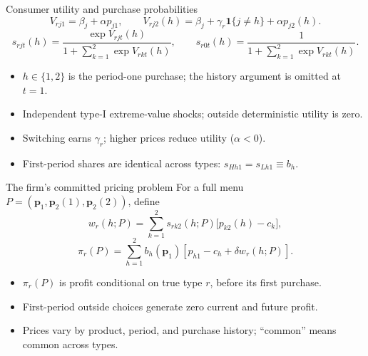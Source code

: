\documentclass[aspectratio=169,11pt]{beamer}
\begin{document}
\begin{frame}[noframenumbering]{Consumer utility and purchase probabilities}
\[
V_{rj1}=\beta_j+\alpha p_{j1},\qquad
V_{rj2}(h)=\beta_j+\gamma_r\mathbf1\{j\ne h\}+\alpha p_{j2}(h).
\]
\[
s_{rjt}(h)=\frac{\exp V_{rjt}(h)}{1+\sum_{k=1}^2\exp V_{rkt}(h)},\qquad
s_{r0t}(h)=\frac{1}{1+\sum_{k=1}^2\exp V_{rkt}(h)}.
\]
\begin{itemize}
\item $h\in\{1,2\}$ is the period-one purchase; the history argument is omitted at $t=1$.
\item Independent type-I extreme-value shocks; outside deterministic utility is zero.
\item Switching earns $\gamma_r$; higher prices reduce utility ($\alpha<0$).
\item First-period shares are identical across types: $s_{Hh1}=s_{Lh1}\equiv b_h$.
\end{itemize}
\par\hyperlink{pricing-setup}{}
\end{frame}

\begin{frame}[noframenumbering]{The firm's committed pricing problem}
For a full menu $P=(\mathbf p_1,\mathbf p_2(1),\mathbf p_2(2))$, define
\[
w_r(h;P)=\sum_{k=1}^2s_{rk2}(h;P)\bigl[p_{k2}(h)-c_k\bigr],
\]
\[
\pi_r(P)=\sum_{h=1}^2 b_h(\mathbf p_1)
\left[p_{h1}-c_h+\delta w_r(h;P)\right].
\]
\begin{itemize}
\item $\pi_r(P)$ is profit conditional on true type $r$, before its first purchase.
\item First-period outside choices generate zero current and future profit.
\item Prices vary by product, period, and purchase history; ``common'' means common across types.
\end{itemize}
\par\hyperlink{pricing-setup}{}
\end{frame}
\end{document}
